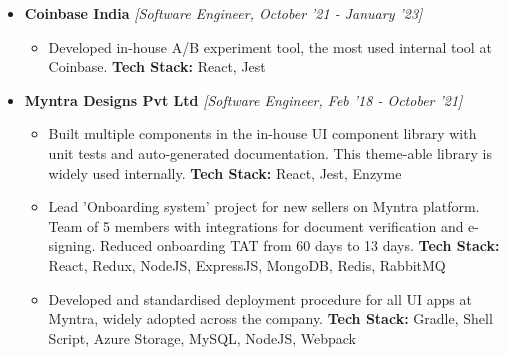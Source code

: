 \documentclass[a4paper,11pt]{article}
\begin{document}
\begin{itemize}
\item \textbf{Coinbase India} \emph{[Software Engineer, October '21 - January '23]}\\[-0.6cm]
\begin{itemize}
\item Developed in-house A/B experiment tool, the most used internal tool at Coinbase.
\textbf{Tech Stack:} React, Jest
\end{itemize}
\item \textbf{Myntra Designs Pvt Ltd} \emph{[Software Engineer, Feb '18 - October '21]}\\[-0.6cm]
\begin{itemize}
\item Built multiple components in the in-house UI component library with unit tests and auto-generated documentation. This theme-able library is widely used internally.
\textbf{Tech Stack:} React, Jest, Enzyme
\item Lead 'Onboarding system' project for new sellers on Myntra platform. Team of 5 members with integrations for document verification and e-signing. Reduced onboarding TAT from 60 days to 13 days.
\textbf{Tech Stack:} React, Redux, NodeJS, ExpressJS, MongoDB, Redis, RabbitMQ
\item Developed and standardised deployment procedure for all UI apps at Myntra, widely adopted across the company.
\textbf{Tech Stack:} Gradle, Shell Script, Azure Storage, MySQL, NodeJS, Webpack

\end{itemize}
\end{itemize}
\end{document}
